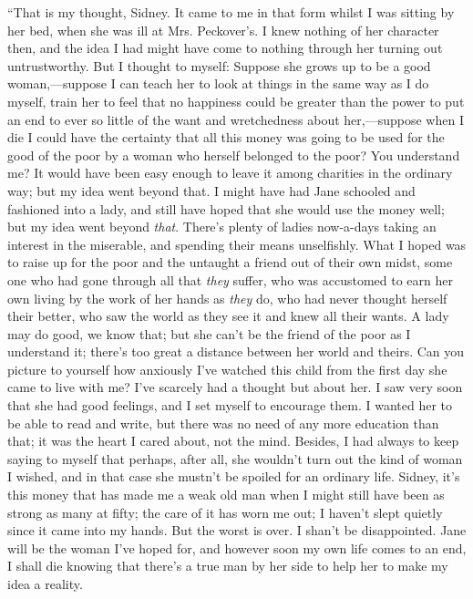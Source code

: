 ``That is my thought, Sidney. It came to me in that form whilst I was
sitting by her bed, when she was ill at Mrs. Peckover's. I knew nothing
of her character then, and the idea I had might have come to nothing
through her turning out untrustworthy. But I thought to myself: Suppose
she grows up to be a good woman,---suppose I can teach her to look at
things in the same way as I do myself, train her to feel that no
happiness could be greater than the power to put an end to ever so
little of the want and wretchedness about her,---suppose when I die I
could have the certainty that all this money was going to be used for
the good of the poor by a woman who herself belonged to the poor? You
understand me? It would have been easy enough to leave it among
charities in the ordinary way; but my idea went beyond that. I might
have had Jane schooled and fashioned into a lady, and still have hoped
that she {}would use the money well; but my idea went beyond
\emph{that}. There's plenty of ladies now-a-days taking an interest in
the miserable, and spending their means unselfishly. What I hoped was to
raise up for the poor and the untaught a friend out of their own midst,
some one who had gone through all that \emph{they} suffer, who was
accustomed to earn her own living by the work of her hands as
\emph{they} do, who had never thought herself their better, who saw the
world as they see it and knew all their wants. A lady may do good, we
know that; but she can't be the friend of the poor as I understand it;
there's too great a distance between her world and theirs. Can you
picture to yourself how anxiously I've watched this child from the first
day she came to live with me? I've scarcely had a thought but about her.
I saw very soon that she had good feelings, and I set myself to
encourage them. I wanted her to be able to read and write, but there was
no need of any more education than that; it was the heart I cared about,
not the mind. Besides, I had {}always to keep saying to myself that
perhaps, after all, she wouldn't turn out the kind of woman I wished,
and in that case she mustn't be spoiled for an ordinary life. Sidney,
it's this money that has made me a weak old man when I might still have
been as strong as many at fifty; the care of it has worn me out; I
haven't slept quietly since it came into my hands. But the worst is
over. I shan't be disappointed. Jane will be the woman I've hoped for,
and however soon my own life comes to an end, I shall die knowing that
there's a true man by her side to help her to make my idea a reality.

